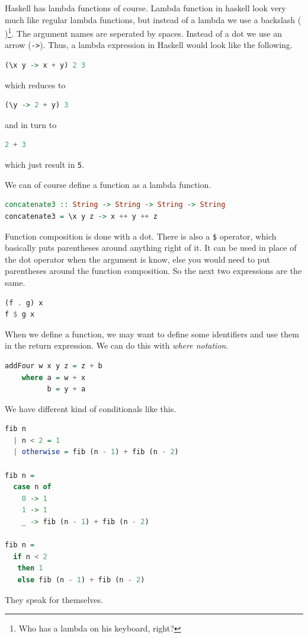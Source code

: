 \documentclass[11pt]{article}
\begin{document}
Haskell has lambda functions of course. Lambda function in haskell look very
much like regular lambda functions, but instead of a lambda we use a backslash
(\texttt{\\})\footnote{Who has a lambda on his keyboard, right?}. The argument
names are seperated by spaces. Instead of a dot we use an arrow (\texttt{->}).
Thus, a lambda expression in Haskell would look like the following.
\begin{lstlisting}[language=Haskell]
(\x y -> x + y) 2 3
\end{lstlisting}
which reduces to
\begin{lstlisting}[language=Haskell]
(\y -> 2 + y) 3
\end{lstlisting}
and in turn to
\begin{lstlisting}[language=Haskell]
2 + 3
\end{lstlisting}
which just result in \texttt{5}.

We can of course define a function as a lambda function.
\begin{lstlisting}[language=Haskell]
concatenate3 :: String -> String -> String -> String
concatenate3 = \x y z -> x ++ y ++ z
\end{lstlisting}

Function composition is done with a dot. There is also a \texttt{\$} operator,
which basically puts parentheses around anything right of it. It can be used in
place of the dot operator when the argument is know, else you would need to put
parentheses around the function composition. So the next two expressions are
the same.
\begin{lstlisting}[language=Haskell]
(f . g) x
f $ g x
\end{lstlisting}

When we define a function, we may want to define some identifiers and use them
in the return expression. We can do this with \emph{where notation}.
\begin{lstlisting}[language=Haskell]
addFour w x y z = z + b
    where a = w + x
          b = y + a
\end{lstlisting}

We have different kind of conditionals like this.
\begin{lstlisting}[language=Haskell]
fib n
  | n < 2 = 1
  | otherwise = fib (n - 1) + fib (n - 2)

fib n = 
  case n of
    0 -> 1
    1 -> 1
    _ -> fib (n - 1) + fib (n - 2)

fib n =
  if n < 2
   then 1
   else fib (n - 1) + fib (n - 2)
\end{lstlisting}
They speak for themselves.
\end{document}
